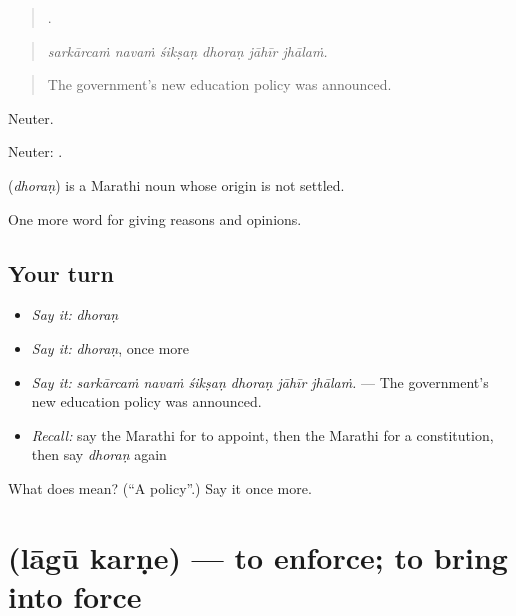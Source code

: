 \begin{quote}
     .
\end{quote}

\begin{quote}
\emph{sarkārcaṁ navaṁ śikṣaṇ dhoraṇ jāhīr jhālaṁ.}
\end{quote}

\begin{quote}
The government's new education policy was announced.
\end{quote}

Neuter.

Neuter:  .

\begin{cousinweb}
\textbf{} (\emph{dhoraṇ}) is a Marathi noun whose origin is not settled.
\end{cousinweb}

\begin{grammarlens}[title={What you've built}]
One more word for giving reasons and opinions.
\end{grammarlens}

\subsection*{Your turn}
\begin{itemize}
\raggedright
  \item \emph{Say it:} \emph{dhoraṇ}
  \item \emph{Say it:} \emph{dhoraṇ}, once more
  \item \emph{Say it:} \emph{sarkārcaṁ navaṁ śikṣaṇ dhoraṇ jāhīr jhālaṁ.} — The government's new education policy was announced.
  \item \emph{Recall:} say the Marathi for to appoint, then the Marathi for a constitution, then say \emph{dhoraṇ} again
\end{itemize}

\begin{tcolorbox}[breakable,colback=teal!4,colframe=teal!35!black,title={Before you move on}]
What does  mean? (\textquotedblleft{}A policy\textquotedblright{}.) Say it once more.
\end{tcolorbox}
\section[\texorpdfstring{\mr{लागू} \mr{करणे} (lāgū karṇe)}{लागू करणे (lāgū karṇe)}]{  (lāgū karṇe) — to enforce; to bring into force}

